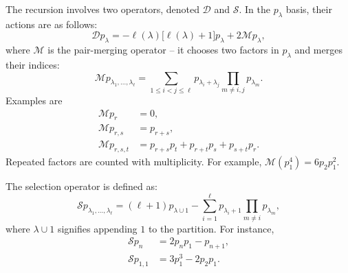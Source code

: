 \documentclass[9pt,twocolumn,twoside]{gsajnl}
\newcommand{\Dop}{\mathcal D}
\newcommand{\Sop}{\mathcal S}
\newcommand{\Mop}{\mathcal M}
\begin{document}

The recursion involves two operators, denoted $\Dop$ and $\Sop$. In the $p_\lambda$ basis, their actions are as follows:
\begin{equation}
\Dop p_\lambda
=
-\ell(\lambda)\bigl[\ell(\lambda)+1\bigr]p_\lambda
+ 2 \Mop p_\lambda,
\label{eq:D-on-p}
\end{equation}
where $\Mop$ is the pair-merging operator -- it chooses two factors in $p_\lambda$ and merges their indices:
\begin{equation}
\Mop p_{\lambda_1,\ldots,\lambda_\ell}
=
\sum_{1\leq i<j\leq \ell}
 p_{\lambda_i+\lambda_j}
 \prod_{m\neq i,j}p_{\lambda_m}.
\label{eq:M-def}
\end{equation}
Examples are
\begin{align}
\Mop p_r &= 0,
\label{eq:M1} \\
\Mop p_{r,s} &= p_{r+s}, \nonumber \\
\Mop p_{r,s,t} &= p_{r+s}p_t+p_{r+t}p_s+p_{s+t}p_r. \nonumber
\end{align}
Repeated factors are counted with multiplicity.  For example, $\Mop(p_1^4)=6p_2p_1^2$.

The selection operator is defined as:
\begin{equation}
\Sop p_{\lambda_1,\ldots,\lambda_\ell}
=
(\ell+1)p_{\lambda\cup 1}
-
\sum_{i=1}^{\ell}
 p_{\lambda_i+1}\prod_{m\neq i}p_{\lambda_m},
\label{eq:S-on-p}
\end{equation}
where $\lambda\cup 1$ signifies appending $1$ to the partition. For instance,
\begin{align} \label{eq:Spn}
\Sop p_{n} &= 2p_np_1-p_{n+1}, \\
\Sop p_{1,1} &= 3p_1^3-2p_2p_1. \nonumber
\end{align}

\end{document}

